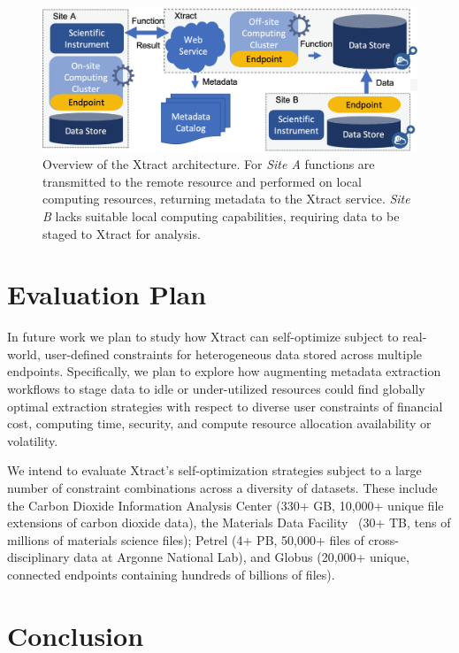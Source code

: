\documentclass[sigconf, 9pt]{acmart}
\newcommand{\name}{Xtract}
\begin{document}
\begin{figure}[t]
	\centering
	\includegraphics[scale=0.17]{figs/updated-fig.png}
	\caption{Overview of the \name{} architecture. For \textit{Site A} functions are transmitted to the remote resource and performed on local computing resources, returning metadata to the \name{} service. \textit{Site B} lacks suitable local
	computing capabilities, requiring data to be staged to \name{} for analysis.}
	\label{fig:arch}
\end{figure}


\section{Evaluation Plan}
\label{sec:eval}

In future work we plan to study how \name{} can self-optimize subject to real-world, user-defined constraints for heterogeneous data stored across multiple 
endpoints.  Specifically, we plan to explore how augmenting metadata extraction workflows to stage data to idle or under-utilized resources could 
find globally optimal extraction strategies with respect to diverse user constraints of financial cost, computing time, security, and compute resource allocation 
availability or volatility.

We intend to evaluate \name{}'s self-optimization strategies subject to a large number of constraint combinations across a diversity of datasets. 
These include the Carbon Dioxide Information Analysis Center (330+ GB, 10,000+ 
unique file extensions of carbon dioxide data), the Materials Data Facility~\cite{ blaiszik2019mdf} (30+ TB, tens of millions of materials science files); 
Petrel (4+ PB, 50,000+ files of cross-disciplinary data at Argonne National Lab), and Globus (20,000+ unique, connected 
endpoints containing hundreds of billions of files).


\section{Conclusion}
\label{sec:conc}
\end{document}
